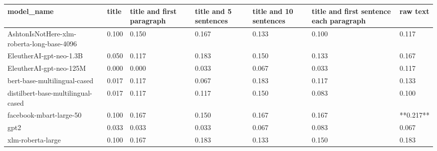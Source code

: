 \begin{tabular}{lllllll}
\toprule
                                model\_name & title & title and first paragraph & title and 5 sentences & title and 10 sentences & title and first sentence each paragraph &  raw text \\
\midrule
AshtonIsNotHere-xlm-roberta-long-base-4096 & 0.100 &                     0.150 &                 0.167 &                  0.133 &                                   0.100 &     0.117 \\
                   EleutherAI-gpt-neo-1.3B & 0.050 &                     0.117 &                 0.183 &                  0.150 &                                   0.133 &     0.167 \\
                   EleutherAI-gpt-neo-125M & 0.000 &                     0.000 &                 0.033 &                  0.067 &                                   0.033 &     0.117 \\
              bert-base-multilingual-cased & 0.017 &                     0.117 &                 0.067 &                  0.183 &                                   0.117 &     0.133 \\
        distilbert-base-multilingual-cased & 0.017 &                     0.117 &                 0.117 &                  0.150 &                                   0.083 &     0.100 \\
                   facebook-mbart-large-50 & 0.100 &                     0.167 &                 0.150 &                  0.167 &                                   0.167 & **0.217** \\
                                      gpt2 & 0.033 &                     0.033 &                 0.033 &                  0.067 &                                   0.083 &     0.067 \\
                         xlm-roberta-large & 0.100 &                     0.167 &                 0.183 &                  0.133 &                                   0.150 &     0.183 \\
\bottomrule
\end{tabular}
